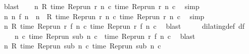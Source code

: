 \begin{isabellebody}
\ blast\isanewline
\ \ \isamarkupfalse%
\ {\isacartoucheopen}{\isasymforall}n{\isachardot}\ R\ {\isacharparenleft}time\ {\isacharparenleft}{\isacharparenleft}Rep{\isacharunderscore}run\ r{\isacharparenright}\ n\ c\ time\ {\isacharparenleft}{\isacharparenleft}Rep{\isacharunderscore}run\ r{\isacharparenright}\ n\ c\ \isamarkupfalse%
\ simp\isanewline
\ \ \isamarkupfalse%
\ {\isacartoucheopen}{\isasymforall}n{\isachardot}\ {\isacharparenleft}{\isasymexists}n\ f\ n\ {\isacharequal}\ n{\isacharparenright}\ {\isasymlongrightarrow}\ R\ {\isacharparenleft}time\ {\isacharparenleft}{\isacharparenleft}Rep{\isacharunderscore}run\ r{\isacharparenright}\ n\ c\ time\ {\isacharparenleft}{\isacharparenleft}Rep{\isacharunderscore}run\ r{\isacharparenright}\ n\ c\ \isamarkupfalse%
\ simp\isanewline
\ \ \isamarkupfalse%
\ {\isacartoucheopen}{\isasymforall}n\ R\ {\isacharparenleft}time\ {\isacharparenleft}{\isacharparenleft}Rep{\isacharunderscore}run\ r{\isacharparenright}\ {\isacharparenleft}f\ n\ c\ time\ {\isacharparenleft}{\isacharparenleft}Rep{\isacharunderscore}run\ r{\isacharparenright}\ {\isacharparenleft}f\ n\ c\ \isamarkupfalse%
\ blast\isanewline
\ \ \isamarkupfalse%
\ \isamarkupfalse%
\ dilating{\isacharunderscore}def\ df\ \isamarkupfalse%
\isanewline
\ \ \ \ {\isacartoucheopen}{\isasymforall}n\ c{\isachardot}\ time\ {\isacharparenleft}{\isacharparenleft}Rep{\isacharunderscore}run\ sub{\isacharparenright}\ n\ c{\isacharparenright}\ {\isacharequal}\ time\ {\isacharparenleft}{\isacharparenleft}Rep{\isacharunderscore}run\ r{\isacharparenright}\ {\isacharparenleft}f\ n{\isacharparenright}\ c{\isacharparenright}{\isacartoucheclose}\ \isamarkupfalse%
\ blast\isanewline
\ \ \isamarkupfalse%
\ \isamarkupfalse%
\ {\isacartoucheopen}{\isasymforall}n\ R\ {\isacharparenleft}time\ {\isacharparenleft}{\isacharparenleft}Rep{\isacharunderscore}run\ sub{\isacharparenright}\ n\ c\ time\ {\isacharparenleft}{\isacharparenleft}Rep{\isacharunderscore}run\ sub{\isacharparenright}\ n\ c\ \isamarkupfalse%

\end{isabellebody}
